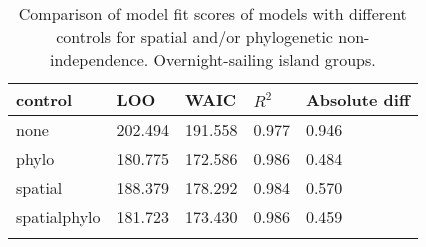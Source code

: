 
\begin{longtable}{p{2cm}p{2cm}p{2cm}p{2cm}p{2cm}}
  \toprule
control & LOO & WAIC & $R^2$ & Absolute diff \\ 
  \midrule
none & 202.494 & 191.558 & 0.977 & 0.946 \\ 
  phylo & 180.775 & 172.586 & 0.986 & 0.484 \\ 
  spatial & 188.379 & 178.292 & 0.984 & 0.570 \\ 
  spatialphylo & 181.723 & 173.430 & 0.986 & 0.459 \\ 
   \bottomrule
\caption{Comparison of model fit scores of models with different controls for spatial and/or phylogenetic non-independence. Overnight-sailing island groups.} 
\label{model_fit_score_table_SBZR}
\end{longtable}
